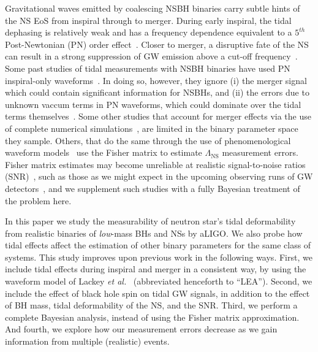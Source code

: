 \documentclass[aps,prd,amsmath,floats,floatfix, twocolumn,
superscriptaddress,nofootinbib,showpacs]{revtex4-1}
\newcommand{\lambdans}{\Lambda_\mathrm{NS}}
\begin{document}
Gravitational waves emitted by coalescing NSBH binaries carry subtle hints of
the NS EoS from inspiral through to merger. During early inspiral, the tidal
dephasing is relatively weak and has a frequency dependence equivalent to a
$5^{th}$ Post-Newtonian (PN) order effect~\cite{Vines2011}. Closer to merger,
a disruptive fate of the NS
can result in a strong suppression of GW emission above a cut-off 
frequency~\cite{Pannarale:2015jia}. Some past studies of tidal measurements
with NSBH binaries have used PN inspiral-only waveforms~\cite{Maselli:2013rza}.
In doing so, however, they ignore (i) the merger signal which could contain significant
information for NSBHs, and (ii) the errors due to unknown vaccum terms in PN 
waveforms, which could dominate over the tidal terms themselves~\cite{Barkett2015,
Yagi:2014}.
% 
Some other studies that account for merger effects via the use of complete
numerical simulations~\cite{Foucart:2013psa}, are limited in the binary
parameter space they sample.
% 
Others, that do the same through the use of phenomenological waveform
models~\cite{Lackey2011,Lackey:2013axa} use the Fisher matrix to estimate
$\lambdans$ measurement errors. Fisher matrix estimates may become
unreliable at realistic signal-to-noise ratios (SNR)~\cite{Vallisneri:2007ev},
such as those as we might expect in the upcoming observing runs of GW
detectors~\cite{Abadie:2010cf}, and we supplement such studies with a
fully Bayesian treatment of the problem here.





In this paper we study the measurability of neutron star's tidal deformability
from realistic binaries of {\it low}-mass BHs and NSs by aLIGO. We also probe
how tidal effects affect the estimation of other binary parameters for the same
class of systems. This study improves upon previous work in the following ways.
% 
First, we include tidal effects during inspiral and merger in a consistent
way, by using the waveform model of Lackey {\it et al.}~\cite{Lackey:2013axa}
(abbreviated henceforth to ``LEA'').
% 
Second, we include the effect of black hole spin on tidal GW signals, in
addition to the effect of BH mass, tidal deformability of the NS, and the SNR.
% 
Third, we perform a complete Bayesian analysis, instead of using the Fisher matrix
approximation.
% 
And fourth, we explore how our measurement errors decrease as we gain information
from multiple (realistic) events.
% 
\end{document}
